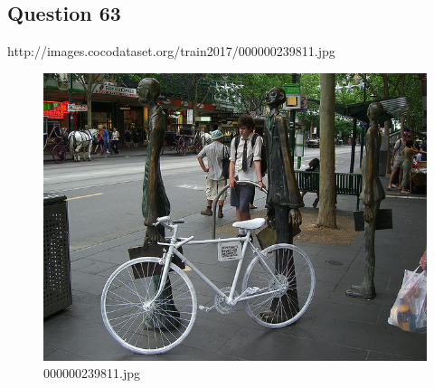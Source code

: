 \subsection*{Question 63}
http://images.cocodataset.org/train2017/000000239811.jpg
\begin{figure}[h]
    \centering
    \includegraphics[width=0.8\linewidth]{../image set/hard/000000239811.jpg}
    \caption{000000239811.jpg}
\end{figure}
